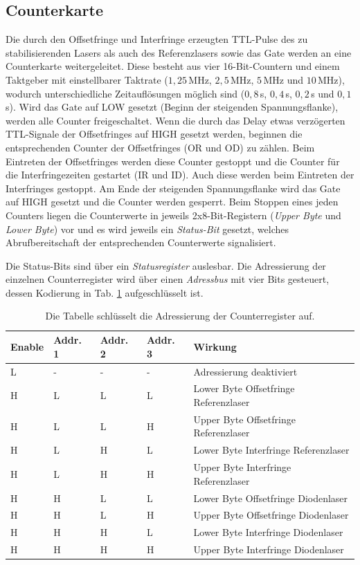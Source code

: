 \subsection{Counterkarte}\label{subsec:counterkarte}
Die durch den Offsetfringe und Interfringe erzeugten
TTL-Pulse des zu stabilisierenden Lasers als auch des Referenzlasers
sowie das Gate werden an eine Counterkarte weitergeleitet. Diese besteht aus
vier 16-Bit-Countern und einem Taktgeber mit einstellbarer Taktrate ($1,25\,$MHz,
$2,5\,$MHz, $5\,$MHz und $10\,$MHz), wodurch unterschiedliche Zeitauflösungen möglich
sind ($0,8\,$\textmu s, $0,4\,$\textmu s, $0,2\,$\textmu s und $0,1\,$\textmu
s).
Wird das Gate auf LOW gesetzt (Beginn der steigenden Spannungsflanke), werden
alle Counter freigeschaltet. Wenn die durch
das Delay etwas verzögerten TTL-Signale der Offsetfringes auf HIGH gesetzt werden, beginnen die
entsprechenden Counter der Offsetfringes (OR und OD) zu zählen. Beim Eintreten
der Offsetfringes werden diese Counter gestoppt und die Counter für die
Interfringezeiten gestartet (IR und ID). Auch diese werden beim Eintreten der
Interfringes gestoppt. Am Ende der steigenden Spannungsflanke wird das Gate auf
HIGH gesetzt und die Counter werden gesperrt. Beim Stoppen eines jeden Counters
liegen die Counterwerte in jeweils 2x8-Bit-Registern (\textit{Upper Byte} und \textit{Lower Byte}) vor und es wird jeweils ein
\textit{Status-Bit} gesetzt, welches Abrufbereitschaft der entsprechenden
Counterwerte signalisiert.\par
Die Status-Bits sind über ein \textit{Statusregister} auslesbar. Die
Adressierung der einzelnen Counterregister wird über einen \textit{Adressbus} mit vier Bits
gesteuert, dessen Kodierung in Tab. \ref{tab:adressbus_kodierung} aufgeschlüsselt ist.
\begin{table}
	\begin{tabular}{p{}p{}p{}p{}|p{}}
		\toprule
		Enable & Addr. 1 & Addr. 2 & Addr. 3 & Wirkung\\
		\midrule[1px]
		\hline
		L & - & - & - & Adressierung deaktiviert\\
		H & L & L & L & Lower Byte Offsetfringe Referenzlaser\\
		H & L & L & H & Upper Byte Offsetfringe Referenzlaser\\
		H & L & H & L & Lower Byte Interfringe Referenzlaser\\
		H & L & H & H & Upper Byte Interfringe Referenzlaser\\
		H & H & L & L & Lower Byte Offsetfringe Diodenlaser\\
		H & H & L & H & Upper Byte Offsetfringe Diodenlaser\\
		H & H & H & L & Lower Byte Interfringe Diodenlaser\\
		H & H & H & H & Upper Byte Interfringe Diodenlaser\\
		\bottomrule[1px]
	\end{tabular}
	\caption[Adressierung Counterregister]{Die Tabelle schlüsselt die Adressierung
	der Counterregister auf.}
	\label{tab:adressbus_kodierung}
\end{table}
